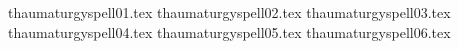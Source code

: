 

\tablepassive{\thaumaturgypassive}{\thaumaturgypassivedef}
\tablelabels
{thaumaturgyspell01.tex}%
\spellrule
{thaumaturgyspell02.tex}%
\spellrule
{thaumaturgyspell03.tex}%
\spellrule
{thaumaturgyspell04.tex}%
\spellrule
{thaumaturgyspell05.tex}%
\spellrule
{thaumaturgyspell06.tex}%
\closetable{}
